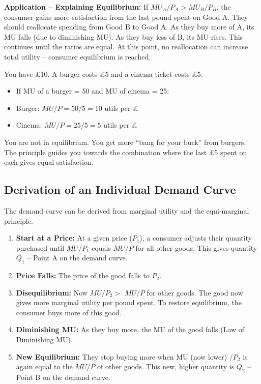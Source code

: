 \documentclass[11pt, a4paper, twoside]{book}
\begin{document}
\textbf{Application -- Explaining Equilibrium:} If $MU_A/P_A > MU_B/P_B$, the consumer gains more satisfaction from the last pound spent on Good A. They should reallocate spending from Good B to Good A. As they buy more of A, its MU falls (due to diminishing MU). As they buy less of B, its MU rises. This continues until the ratios are equal. At this point, no reallocation can increase total utility -- consumer equilibrium is reached.

\begin{example}
You have £10. A burger costs £5 and a cinema ticket costs £5.
\begin{itemize}
  \item If MU of a burger = 50 and MU of cinema = 25:
  \item Burger: $MU/P = 50/5 = 10$ utils per £
  \item Cinema: $MU/P = 25/5 = 5$ utils per £
\end{itemize}
You are not in equilibrium. You get more ``bang for your buck'' from burgers. The principle guides you towards the combination where the last £5 spent on each gives equal satisfaction.
\end{example}

\subsection{Derivation of an Individual Demand Curve}

The demand curve can be derived from marginal utility and the equi-marginal principle.

\begin{enumerate}
  \item \textbf{Start at a Price:} At a given price ($P_1$), a consumer adjusts their quantity purchased until $MU/P_1$ equals $MU/P$ for all other goods. This gives quantity $Q_1$ -- Point A on the demand curve.
  \item \textbf{Price Falls:} The price of the good falls to $P_2$.
  \item \textbf{Disequilibrium:} Now $MU/P_2 >$ $MU/P$ for other goods. The good now gives more marginal utility per pound spent. To restore equilibrium, the consumer buys more of this good.
  \item \textbf{Diminishing MU:} As they buy more, the MU of the good falls (Law of Diminishing MU).
  \item \textbf{New Equilibrium:} They stop buying more when MU (now lower) $/P_2$ is again equal to the $MU/P$ of other goods. This new, higher quantity is $Q_2$ -- Point B on the demand curve.
\end{enumerate}
\end{document}
